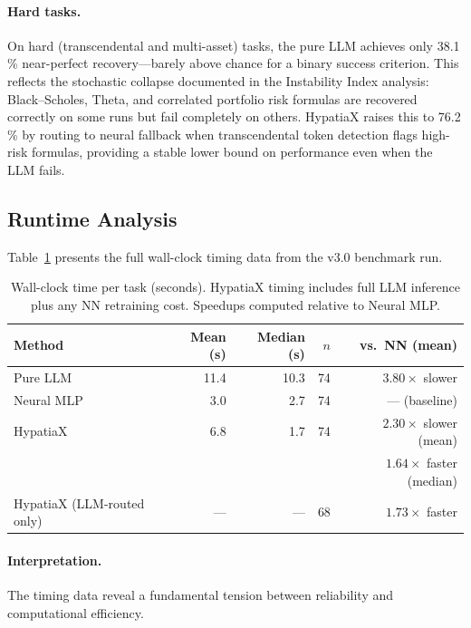 \documentclass[twoside,11pt]{article}
\begin{document}
\paragraph{Hard tasks.}
On hard (transcendental and multi-asset) tasks, the pure LLM achieves only 38.1\,\%
near-perfect recovery---barely above chance for a binary success criterion.  This
reflects the stochastic collapse documented in the Instability Index analysis:
Black--Scholes, Theta, and correlated portfolio risk formulas are recovered correctly
on some runs but fail completely on others.  HypatiaX raises this to 76.2\,\% by
routing to neural fallback when transcendental token detection flags high-risk
formulas, providing a stable lower bound on performance even when the LLM fails.

\subsection{Runtime Analysis}
\label{sec:timing}

Table~\ref{tab:timing} presents the full wall-clock timing data from the v3.0
benchmark run.

\begin{table}[h]
\centering
\caption{Wall-clock time per task (seconds). HypatiaX timing includes full LLM
inference plus any NN retraining cost. Speedups computed relative to Neural MLP.}
\label{tab:timing}
\begin{tabular}{lrrrr}
\toprule
Method & Mean (s) & Median (s) & $n$ & vs.\ NN (mean) \\
\midrule
Pure LLM   & 11.4 & 10.3 & 74 & $3.80\times$ slower \\
Neural MLP &  3.0 &  2.7 & 74 & --- (baseline) \\
HypatiaX   &  6.8 &  1.7 & 74 & $2.30\times$ slower (mean) \\
            &      &      &    & $1.64\times$ faster (median) \\
\midrule
HypatiaX (LLM-routed only) & --- & --- & 68 & $1.73\times$ faster \\
\bottomrule
\end{tabular}
\end{table}

\paragraph{Interpretation.}
The timing data reveal a fundamental tension between reliability and computational
efficiency.
\end{document}
